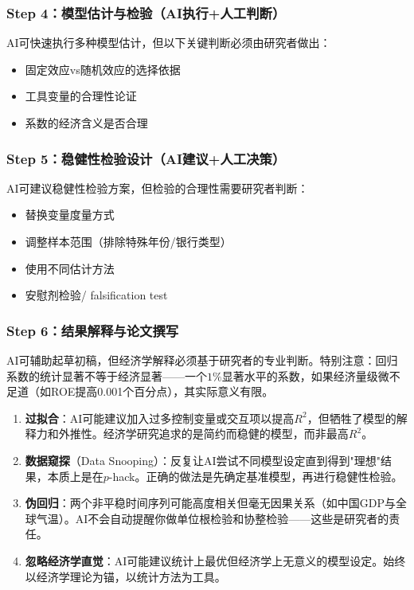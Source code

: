 \subsubsection{Step 4：模型估计与检验（AI执行+人工判断）}

AI可快速执行多种模型估计，但以下关键判断必须由研究者做出：
\begin{itemize}[leftmargin=2em]
  \item 固定效应vs随机效应的选择依据
  \item 工具变量的合理性论证
  \item 系数的经济含义是否合理
\end{itemize}

\subsubsection{Step 5：稳健性检验设计（AI建议+人工决策）}

AI可建议稳健性检验方案，但检验的合理性需要研究者判断：
\begin{itemize}[leftmargin=2em]
  \item 替换变量度量方式
  \item 调整样本范围（排除特殊年份/银行类型）
  \item 使用不同估计方法
  \item 安慰剂检验/ falsification test
\end{itemize}

\subsubsection{Step 6：结果解释与论文撰写}

AI可辅助起草初稿，但经济学解释必须基于研究者的专业判断。特别注意：回归系数的统计显著不等于经济显著——一个$1\%$显著水平的系数，如果经济量级微不足道（如ROE提高0.001个百分点），其实际意义有限。

\begin{warningbox}[AI计量分析的常见陷阱]
\begin{enumerate}[leftmargin=2em]
  \item \textbf{过拟合}：AI可能建议加入过多控制变量或交互项以提高$R^2$，但牺牲了模型的解释力和外推性。经济学研究追求的是简约而稳健的模型，而非最高$R^2$。

  \item \textbf{数据窥探}（Data Snooping）：反复让AI尝试不同模型设定直到得到"理想"结果，本质上是在$p$-hack。正确的做法是先确定基准模型，再进行稳健性检验。

  \item \textbf{伪回归}：两个非平稳时间序列可能高度相关但毫无因果关系（如中国GDP与全球气温）。AI不会自动提醒你做单位根检验和协整检验——这些是研究者的责任。

  \item \textbf{忽略经济学直觉}：AI可能建议统计上最优但经济学上无意义的模型设定。始终以经济学理论为锚，以统计方法为工具。
\end{enumerate}
\end{warningbox}


